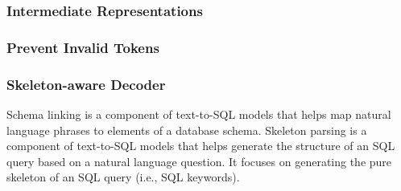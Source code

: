 \subsubsection{Intermediate Representations}

\subsubsection{Prevent Invalid Tokens}

\subsubsection{Skeleton-aware Decoder}

Schema linking is a component of text-to-SQL models that helps map natural language phrases to elements of a database schema.
Skeleton parsing is a component of text-to-SQL models that helps generate the structure of an SQL query based on a natural language question. It focuses on generating the pure skeleton of an SQL query (i.e., SQL keywords).